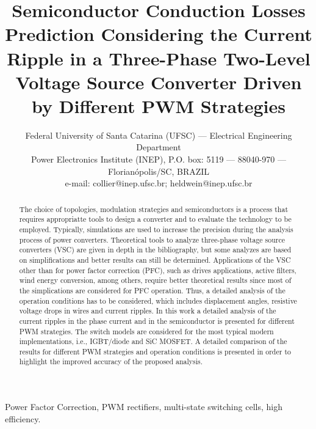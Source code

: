 \documentclass[10pt, conference]{IEEEtran}
\begin{document}
\title{ {{\Large{Semiconductor Conduction Losses Prediction Considering the Current Ripple in a Three-Phase Two-Level Voltage Source Converter Driven by Different PWM Strategies}}}}

\author{ 
\small Federal University of Santa Catarina (UFSC) ---  Electrical Engineering Department \\
\small Power Electronics Institute (INEP), P.O. box: 5119 --- 88040-970 --- Florian\'opolis/SC, BRAZIL\\
\small {e-mail: collier@inep.ufsc.br;  heldwein@inep.ufsc.br}}

\maketitle
 
\begin{abstract}
The choice of topologies, modulation strategies and semiconductors is a process that requires appropriatte tools to design a converter and to evaluate the technology to be employed. Typically, simulations are used to increase the precision during the analysis process of power converters. Theoretical tools to analyze three-phase voltage source converters (VSC) are given in depth in the bibliography, but some analyzes are based on simplifications and better results can still be determined. Applications of the VSC other than for power factor correction (PFC), such as drives applications, active filters, wind energy conversion, among others, require better theoretical results since most of the simplications are considered for PFC operation. Thus, a detailed analysis of the operation conditions has to be considered, which includes displacement angles, resistive voltage drops in wires and current ripples. In this work a detailed analysis of the current ripples in the phase current and in the semiconductor is presented for different PWM strategies. The switch models are considered for the most typical modern implementations, i.e., IGBT/diode and SiC MOSFET. A detailed comparison of the results for different PWM strategies and operation conditions is presented in order to highlight the improved accuracy of the proposed analysis.
\end{abstract}

\begin{IEEEkeywords}
 Power Factor Correction, PWM rectifiers, multi-state switching cells, high efficiency.
\end{IEEEkeywords}
\end{document}
